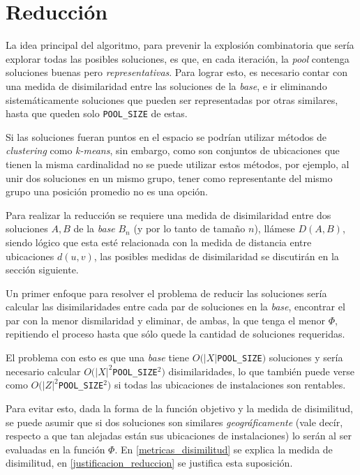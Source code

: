 \section{Reducción}

La idea principal del algoritmo, para prevenir la explosión combinatoria que sería explorar todas las posibles soluciones, es que, en cada iteración, la \emph{pool} contenga soluciones buenas pero \emph{representativas}. Para lograr esto, es necesario contar con una medida de disimilaridad entre las soluciones de la \emph{base}, e ir eliminando sistemáticamente soluciones que pueden ser representadas por otras similares, hasta que queden solo \texttt{POOL\_SIZE} de estas.

Si las soluciones fueran puntos en el espacio se podrían utilizar métodos de \emph{clustering} como \emph{k-means}, sin embargo, como son conjuntos de ubicaciones que tienen la misma cardinalidad no se puede utilizar estos métodos, por ejemplo, al unir dos soluciones en un mismo grupo, tener como representante del mismo grupo una posición promedio no es una opción.

Para realizar la reducción se requiere una medida de disimilaridad entre dos soluciones $A,B$ de la \emph{base} $B_n$ (y por lo tanto de tamaño $n$), llámese $D(A,B)$, siendo lógico que esta esté relacionada con la medida de distancia entre ubicaciones $d(u,v)$, las posibles medidas de disimilaridad se discutirán en la sección siguiente.

Un primer enfoque para resolver el problema de reducir las soluciones sería calcular las disimilaridades entre cada par de soluciones en la \emph{base}, encontrar el par con la menor dismilaridad y eliminar, de ambas, la que tenga el menor $\Phi$, repitiendo el proceso hasta que sólo quede la cantidad de soluciones requeridas.

El problema con esto es que una \emph{base} tiene $O(|X|$\texttt{POOL\_SIZE}$)$ soluciones y sería necesario calcular $O({|X|}^2$\texttt{POOL\_SIZE}$^2)$ disimilaridades, lo que también puede verse como $O({|Z|}^2$\texttt{POOL\_SIZE}$^2)$ si todas las ubicaciones de instalaciones son rentables.

Para evitar esto, dada la forma de la función objetivo y la medida de disimilitud, se puede asumir que si dos soluciones son similares \emph{geográficamente} (vale decír, respecto a que tan alejadas están sus ubicaciones de instalaciones) lo serán al ser evaluadas en la función $\Phi$. En
\ref{metricas_disimilitud} se explica la medida de disimilitud, en \ref{justificacion_reduccion} se justifica esta suposición.

